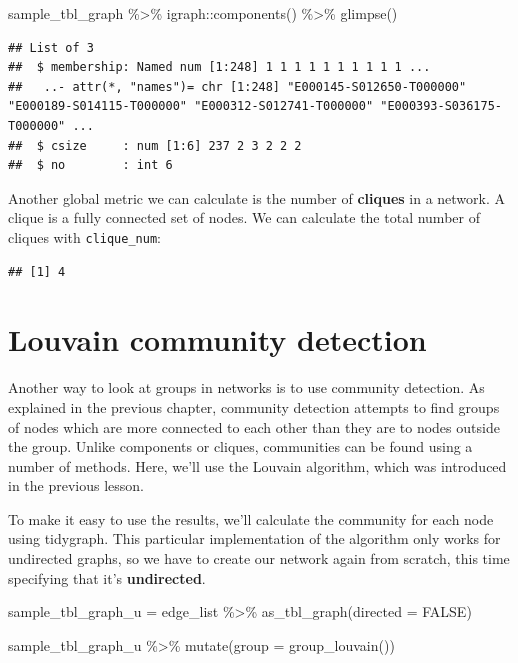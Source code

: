 \documentclass[
]{book}
\newenvironment{Shaded}{\begin{snugshade}}{\end{snugshade}}
\newcommand{\AttributeTok}[1]{\textcolor[rgb]{0.77,0.63,0.00}{#1}}
\newcommand{\ConstantTok}[1]{\textcolor[rgb]{0.00,0.00,0.00}{#1}}
\newcommand{\FunctionTok}[1]{\textcolor[rgb]{0.00,0.00,0.00}{#1}}
\newcommand{\NormalTok}[1]{#1}
\newcommand{\OtherTok}[1]{\textcolor[rgb]{0.56,0.35,0.01}{#1}}
\newcommand{\SpecialCharTok}[1]{\textcolor[rgb]{0.00,0.00,0.00}{#1}}
\begin{document}
\begin{Shaded}
\begin{Highlighting}[]
\NormalTok{sample\_tbl\_graph }\SpecialCharTok{\%\textgreater{}\%}\NormalTok{ igraph}\SpecialCharTok{::}\FunctionTok{components}\NormalTok{() }\SpecialCharTok{\%\textgreater{}\%} \FunctionTok{glimpse}\NormalTok{()}
\end{Highlighting}
\end{Shaded}

\begin{verbatim}
## List of 3
##  $ membership: Named num [1:248] 1 1 1 1 1 1 1 1 1 1 ...
##   ..- attr(*, "names")= chr [1:248] "E000145-S012650-T000000" "E000189-S014115-T000000" "E000312-S012741-T000000" "E000393-S036175-T000000" ...
##  $ csize     : num [1:6] 237 2 3 2 2 2
##  $ no        : int 6
\end{verbatim}

Another global metric we can calculate is the number of \textbf{cliques} in a network. A clique is a fully connected set of nodes. We can calculate the total number of cliques with \texttt{clique\_num}:

\begin{verbatim}
## [1] 4
\end{verbatim}

\hypertarget{louvain-community-detection-1}{%
\section{Louvain community detection}\label{louvain-community-detection-1}}

Another way to look at groups in networks is to use community detection. As explained in the previous chapter, community detection attempts to find groups of nodes which are more connected to each other than they are to nodes outside the group. Unlike components or cliques, communities can be found using a number of methods. Here, we'll use the Louvain algorithm, which was introduced in the previous lesson.

To make it easy to use the results, we'll calculate the community for each node using tidygraph. This particular implementation of the algorithm only works for undirected graphs, so we have to create our network again from scratch, this time specifying that it's \textbf{undirected}.

\begin{Shaded}
\begin{Highlighting}[]
\NormalTok{sample\_tbl\_graph\_u }\OtherTok{=}\NormalTok{ edge\_list }\SpecialCharTok{\%\textgreater{}\%} 
  \FunctionTok{as\_tbl\_graph}\NormalTok{(}\AttributeTok{directed =} \ConstantTok{FALSE}\NormalTok{)}

\NormalTok{sample\_tbl\_graph\_u }\SpecialCharTok{\%\textgreater{}\%} 
  \FunctionTok{mutate}\NormalTok{(}\AttributeTok{group =} \FunctionTok{group\_louvain}\NormalTok{())}
\end{Highlighting}
\end{Shaded}
\end{document}
